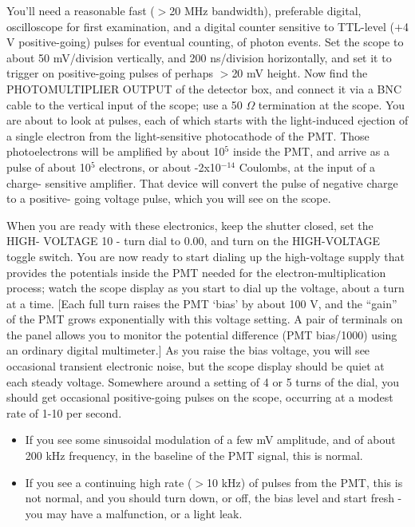 \documentclass[11pt]{article}
\begin{document}

You’ll need a reasonable fast ($>$20 MHz bandwidth), preferable digital,
oscilloscope for first examination, and a digital counter sensitive to TTL-level
($+$4 V positive-going) pulses for eventual counting, of photon events. Set the
scope to about 50 mV/division vertically, and 200 ns/division horizontally, and
set it to trigger on positive-going pulses of perhaps $>$20 mV height. Now find
the PHOTOMULTIPLIER OUTPUT of the detector box, and connect it via a BNC cable
to the vertical input of the scope; use a 50 $\Omega$ termination at the scope.
You are about to look at pulses, each of which starts with the light-induced
ejection of a single electron from the light-sensitive photocathode of the PMT.
Those photoelectrons will be amplified by about 10$^5$ inside the PMT, and
arrive as a pulse of about 10$^5$ electrons, or about -2x10$^{-14}$ Coulombs,
at the input of a charge- sensitive amplifier. That device will convert the
pulse of negative charge to a positive- going voltage pulse, which you will see
on the scope.

When you are ready with these electronics, keep the shutter closed, set the
HIGH- VOLTAGE 10 - turn dial to 0.00, and turn on the HIGH-VOLTAGE toggle
switch. You are now ready to start dialing up the high-voltage supply that
provides the potentials inside the PMT needed for the electron-multiplication
process; watch the scope display as you start to dial up the voltage, about a
turn at a time. [Each full turn raises the PMT ‘bias’ by about 100 V, and the
``gain'' of the PMT grows exponentially with this voltage setting. A pair of
terminals on the panel allows you to monitor the potential difference (PMT
bias/1000) using an ordinary digital multimeter.] As you raise the bias voltage,
you will see occasional transient electronic noise, but the scope display should
be quiet at each steady voltage. Somewhere around a setting of 4 or 5 turns of
the dial, you should get occasional positive-going pulses on the scope,
occurring at a modest rate of 1-10 per second.

\begin{itemize}
\item If you see some sinusoidal modulation of a few mV amplitude, and of about
200 kHz frequency, in the baseline of the PMT signal, this is normal.

\item If you see a continuing high rate ($>$10 kHz) of pulses from the PMT, this
is not normal, and you should turn down, or off, the bias level and start
fresh - you may have a malfunction, or a light leak.
\end{itemize}
\end{document}
